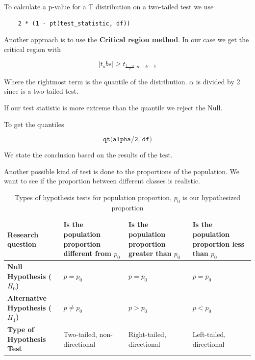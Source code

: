 To calculate a p-value for a T distribution on a two-tailed test we use

\begin{verbatim}
    2 * (1 - pt(test_statistic, df))
\end{verbatim}

\vspace{10pt}

Another approach is to use the \textbf{Critical region method}. In our case we get the critical region with

\begin{equation*}
    |t_obs| \geq t_{\frac{1-\alpha}{2};n-k-1}
\end{equation*}
 
Where the rightmost term is the quantile of the distribution. $\alpha$ is divided by 2 since is a two-tailed test.

If our test statistic is more extreme than the quantile we reject the Null.

To get the quantiles

\[
\texttt{qt(alpha/2, df)}
\]

\vspace{10pt}

We state the conclusion based on the results of the test.

\vspace{20pt}

Another possible kind of test is done to the proportions of the population.
We want to see if the proportion between different classes is realistic.

\begin{table}[h!]
\centering
\begin{tabular}{|p{3cm}|p{3.5cm}|p{3.5cm}|p{3.5cm}|}
\hline
\textbf{Research question} & Is the population \newline proportion different from $p_0$ & Is the population \newline proportion greater than $p_0$ & Is the population \newline proportion less than $p_0$ \\
\hline
\textbf{Null Hypothesis ($H_0$)} & $p = p_0$ & $p = p_0$ & $p = p_0$ \\
\hline
\textbf{Alternative Hypothesis ($H_1$)} & $p \neq p_0$ & $p > p_0$ & $p < p_0$ \\
\hline
\textbf{Type of Hypothesis Test} & Two-tailed, \newline non-directional & Right-tailed, \newline directional & Left-tailed, \newline directional \\
\hline
\end{tabular}
\caption{Types of hypothesis tests for population proportion, $p_0$ is our hypothesized proportion}
\end{table}

